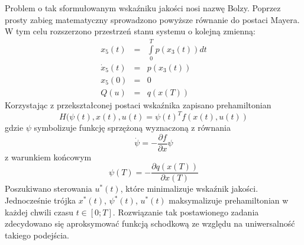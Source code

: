 Problem o tak sformułowanym wskaźniku jakości nosi nazwę Bolzy. Poprzez prosty zabieg matematyczny sprowadzono powyższe równanie do postaci Mayera. W tym celu rozszerzono przestrzeń stanu systemu o kolejną zmienną:
\begin{equation}
\begin{aligned}
x_5(t)&=&\int\limits_{0}^{T}p(x_3(t))dt \\
\dot{x}_5(t)&=&p(x_3(t))\\
x_5(0)&=&0\\
Q(u)&=&q(x(T))
\end{aligned}
\end{equation}
Korzystając z przekształconej postaci wskaźnika zapisano prehamiltonian
\begin{equation}
H(\psi(t),x(t),u(t)=\psi(t)^Tf(x(t),u(t))
\end{equation}
gdzie $\psi$ symbolizuje funkcję sprzężoną wyznaczoną z równania
\begin{equation}
\dot \psi=-\frac{\partial f}{\partial x}\psi
\end{equation}
z warunkiem końcowym
\begin{equation}
\psi(T)=-\frac{\partial q(x(T))}{\partial x(T)}
\end{equation}
Poszukiwano sterowania $u^*(t)$, które minimalizuje wskaźnik jakości. Jednocześnie trójka $x^*(t)$, $\psi^*(t)$, $u^*(t)$ maksymalizuje prehamiltonian w każdej chwili czasu $t\in[0;T]$. Rozwiązanie tak postawionego zadania zdecydowano się aproksymować funkcją schodkową ze względu na uniwersalność takiego podejścia.

